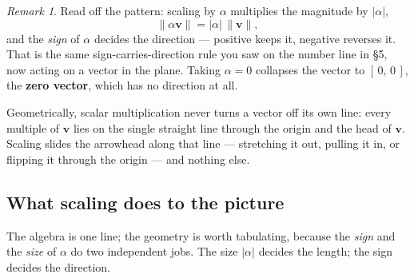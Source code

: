 \documentclass[11pt]{article}
\theoremstyle{definition}
\theoremstyle{remark}
\newtheorem*{rmk}{Remark}
\newcommand{\vc}[1]{\mathbf{#1}}
\newcommand{\norm}[1]{\lVert #1\rVert}
\newcommand{\lattice}[4]{%
  \draw[step=1cm,gray!25,very thin] (#1,#3) grid (#2,#4);
  \draw[axisline] (#1,0) -- (#2+0.45,0) node[right,font=\scriptsize,black]{$x$};
  \draw[axisline] (0,#3) -- (0,#4+0.45) node[above,font=\scriptsize,black]{$y$};
}
\begin{document}
\begin{rmk}
Read off the pattern: scaling by $\alpha$ multiplies the magnitude by
$\lvert\alpha\rvert$,
\[
  \norm{\alpha\vc{v}}=\lvert\alpha\rvert\,\norm{\vc{v}},
\]
and the \emph{sign} of $\alpha$ decides the direction --- positive keeps it,
negative reverses it. That is the same sign-carries-direction rule you saw on
the number line in \S5, now acting on a vector in the plane. Taking $\alpha=0$
collapses the vector to $[\,0,\,0\,]$, the \textbf{zero vector}, which has no
direction at all.
\end{rmk}

\noindent Geometrically, scalar multiplication never turns a vector off its own
line: every multiple of $\vc{v}$ lies on the single straight line through the
origin and the head of $\vc{v}$. Scaling slides the arrowhead along that line
--- stretching it out, pulling it in, or flipping it through the origin --- and
nothing else.

\begin{center}
\end{center}

\subsection{What scaling does to the picture}
The algebra is one line; the geometry is worth tabulating, because the
\emph{sign} and the \emph{size} of $\alpha$ do two independent jobs. The size
$\lvert\alpha\rvert$ decides the length; the sign decides the direction.
\end{document}
